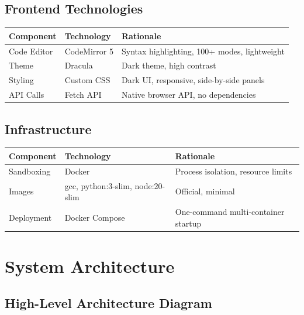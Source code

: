 \documentclass[12pt,a4paper]{report}
\begin{document}
\section{Frontend Technologies}
\begin{longtable}{@{}p{3.5cm}p{3.5cm}p{7cm}@{}}
\toprule
\textbf{Component} & \textbf{Technology} & \textbf{Rationale} \\
\midrule
Code Editor & CodeMirror 5 & Syntax highlighting, 100+ modes, lightweight \\
Theme & Dracula & Dark theme, high contrast \\
Styling & Custom CSS & Dark UI, responsive, side-by-side panels \\
API Calls & Fetch API & Native browser API, no dependencies \\
\bottomrule
\end{longtable}

\section{Infrastructure}
\begin{longtable}{@{}p{3.5cm}p{3.5cm}p{7cm}@{}}
\toprule
\textbf{Component} & \textbf{Technology} & \textbf{Rationale} \\
\midrule
Sandboxing & Docker & Process isolation, resource limits \\
Images & gcc, python:3-slim, node:20-slim & Official, minimal \\
Deployment & Docker Compose & One-command multi-container startup \\
\bottomrule
\end{longtable}

\chapter{System Architecture}

\section{High-Level Architecture Diagram}
\end{document}

